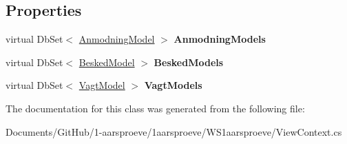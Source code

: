 \subsection*{Properties}
\begin{DoxyCompactItemize}
\item 
\hypertarget{class_w_s1aarsproeve_1_1_view_context_a9ccf4463f480dfe71619a1feae501547}{}virtual Db\+Set$<$ \hyperlink{class_w_s1aarsproeve_1_1_anmodning_model}{Anmodning\+Model} $>$ {\bfseries Anmodning\+Models}\label{class_w_s1aarsproeve_1_1_view_context_a9ccf4463f480dfe71619a1feae501547}

\item 
\hypertarget{class_w_s1aarsproeve_1_1_view_context_ae6d43c37783ea6ea2bc0c54549529ee2}{}virtual Db\+Set$<$ \hyperlink{class_w_s1aarsproeve_1_1_besked_model}{Besked\+Model} $>$ {\bfseries Besked\+Models}\label{class_w_s1aarsproeve_1_1_view_context_ae6d43c37783ea6ea2bc0c54549529ee2}

\item 
\hypertarget{class_w_s1aarsproeve_1_1_view_context_a03d7c6da912ebe40b6368b2cdbbef1d1}{}virtual Db\+Set$<$ \hyperlink{class_w_s1aarsproeve_1_1_vagt_model}{Vagt\+Model} $>$ {\bfseries Vagt\+Models}\label{class_w_s1aarsproeve_1_1_view_context_a03d7c6da912ebe40b6368b2cdbbef1d1}

\end{DoxyCompactItemize}


The documentation for this class was generated from the following file\+:\begin{DoxyCompactItemize}
\item 
Documents/\+Git\+Hub/1-\/aarsproeve/1aarsproeve/\+W\+S1aarsproeve/View\+Context.\+cs\end{DoxyCompactItemize}
